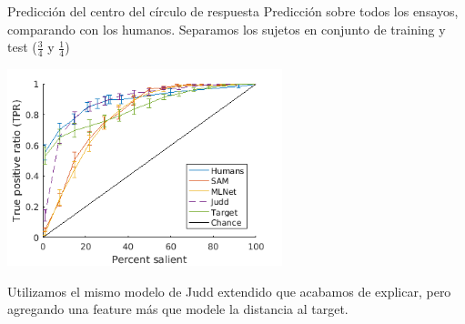 \documentclass[compress]{beamer}
\begin{document}

\begin{frame}{Predicción del centro del círculo de respuesta}
{Predicción sobre todos los ensayos, comparando con los humanos. Separamos los sujetos en conjunto de training y test ($\frac{3}{4}$ y $\frac{1}{4}$)}

\begin{center}
\includegraphics[width=0.6\textwidth]{images/guess_all_test_2.png} 
\end{center}

{\footnotesize Utilizamos el mismo modelo de Judd extendido que acabamos de explicar, pero agregando una feature más que modele la distancia al target.}
\end{frame}


\end{document}
